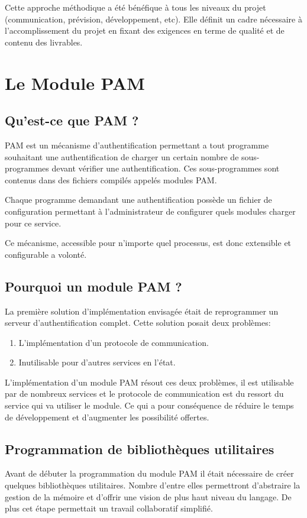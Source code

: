     Cette approche méthodique a été bénéfique à tous les niveaux du projet (communication, prévision, développement, etc). Elle définit un cadre
    nécessaire à l'accomplissement du projet en fixant des exigences en terme
    de qualité et de contenu des livrables.


\newpage
\section{Le Module PAM}
\subsection{Qu'est-ce que PAM ?}
PAM est un mécanisme d'authentification permettant a tout programme souhaitant
une authentification de charger un certain nombre de sous-programmes devant
vérifier une authentification. Ces sous-programmes sont contenus dans des
fichiers compilés appelés modules PAM.

Chaque programme demandant une authentification possède un fichier de configuration permettant à l'administrateur de configurer quels modules charger pour ce service.

Ce mécanisme, accessible pour n'importe quel processus, est donc extensible et configurable a volonté.
\subsection{Pourquoi un module PAM ?}
La première solution d'implémentation envisagée était de reprogrammer un
serveur d'authentification complet. Cette solution posait deux problèmes:
\begin{enumerate}
  \item L'implémentation d'un protocole de communication.
  \item Inutilisable pour d'autres services en l'état.
\end{enumerate}

L'implémentation d'un module PAM résout ces deux problèmes, il est utilisable
par de nombreux services et le protocole de communication est du ressort du
service qui va utiliser le module. Ce qui a pour conséquence de réduire le
temps de développement et d'augmenter les possibilité offertes.

\subsection{Programmation de bibliothèques utilitaires}
Avant de débuter la programmation du module PAM il était nécessaire de créer
quelques bibliothèques utilitaires. Nombre d'entre elles permettront
d'abstraire la gestion de la mémoire et d'offrir une vision de plus haut niveau
du langage. De plus cet étape permettait un travail collaboratif simplifié.

